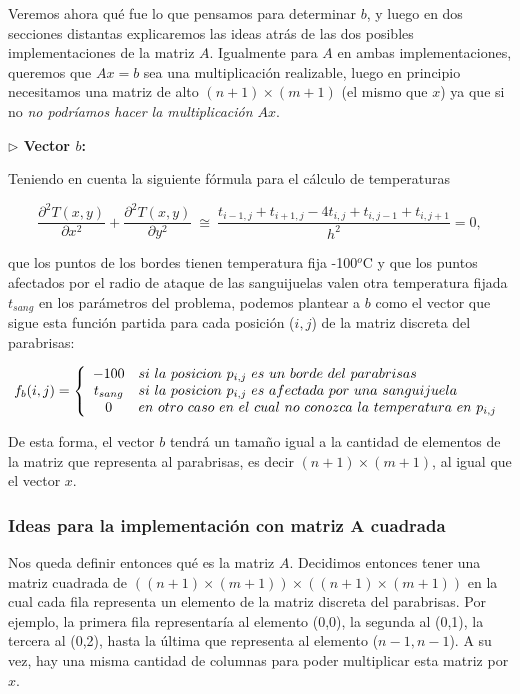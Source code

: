 Veremos ahora qué fue lo que pensamos para determinar $b$, y luego en dos secciones distantas explicaremos las ideas atrás de las dos posibles implementaciones de la matriz $A$. Igualmente para $A$ en ambas implementaciones, queremos que $Ax = b$ sea una multiplicación realizable, luego en principio necesitamos una matriz de alto $(n+1) \times (m+1)$  (el mismo que $x$) ya que si no \textit{no podríamos hacer la multiplicación $Ax$}.

\vspace{\baselineskip}

\vspace{\baselineskip}

{\large \textbf{ $\rhd$ Vector $b$:}}

\vspace{\baselineskip}

 Teniendo en cuenta la siguiente fórmula para el cálculo de temperaturas

\[
\frac{\partial^2T(x,y)}{\partial x^{2}}+\frac{\partial^2 T(x,y)}{\partial y^{2}} \ \cong \ \frac{ t_{i-1,j} + t_{i+1,j} - 4t_{i,j} + t_{i,j-1} + t_{i,j+1}}{h^2} = 0,
\]

que los puntos de los bordes tienen temperatura fija -100${}^o$C y que los puntos afectados por el radio de ataque de las sanguijuelas valen otra temperatura fijada $t_{sang}$ en los parámetros del problema, podemos plantear a $b$ como el vector que sigue esta función partida para cada posición ($i,j$) de la matriz discreta del parabrisas:

$$f_{b}(i,j) = \left\{
\begin{array}{c l}
 -100 & si \ la \ posicion  \ p_{i,j} \ es  \ un \ borde  \ del \ parabrisas\\
 t_{sang} & si \ la \ posicion  \ p_{i,j} \ es \ afectada \ por \ una \ sanguijuela \\
 0 & en \ otro \ caso \ en \ el \ cual \ no \ conozca \ la \ temperatura \ en \ p_{i,j}
\end{array}
\right.
$$

De esta forma, el vector $b$ tendrá un tamaño igual a la cantidad de elementos de la matriz que representa al parabrisas, es decir $(n+1) \times (m+1)$, al igual que el vector $x$.

\subsubsection{Ideas para la implementación con matriz A cuadrada}

Nos queda definir entonces qué es la matriz $A$. Decidimos entonces tener una matriz cuadrada de  $((n+1) \times (m+1)) \times  ((n+1) \times (m+1))$ en la cual cada fila representa un elemento de la matriz discreta del parabrisas. Por ejemplo, la primera fila representaría al elemento (0,0), la segunda al (0,1), la tercera al (0,2), hasta la última que representa al elemento ($n-1,n-1$). A su vez, hay una misma cantidad de columnas para poder multiplicar esta matriz por $x$.

